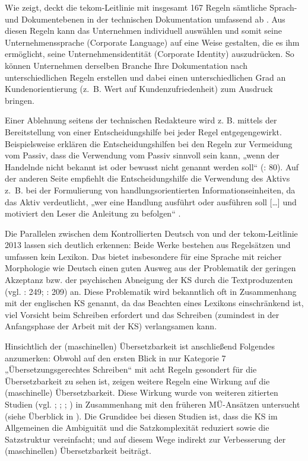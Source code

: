 Wie   zeigt, deckt die tekom-Leitlinie mit insgesamt 167 Regeln sämtliche Sprach- und Dokumentebenen in der technischen Dokumentation umfassend ab \citep{tekom2013}. Aus diesen Regeln kann das Unternehmen individuell auswählen und somit seine Unternehmenssprache (Corporate Language) auf eine Weise gestalten, die es ihm ermöglicht, seine Unternehmensidentität (Corporate Identity) auszudrücken. So können Unternehmen derselben Branche Ihre Dokumentation nach unterschiedlichen Regeln erstellen und dabei einen unterschiedlichen Grad an Kundenorientierung (z.~B. Wert auf Kundenzufriedenheit) zum Ausdruck bringen.

Einer Ablehnung seitens der technischen Redakteure wird z. B. mittels der Bereitstellung von einer Entscheidungshilfe bei jeder Regel entgegengewirkt. Beispielsweise erklären die Entscheidungshilfen bei den Regeln zur Vermeidung vom Passiv, dass die Verwendung vom Passiv sinnvoll sein kann, „wenn der Handelnde nicht bekannt ist oder bewusst nicht genannt werden soll“ (\citealt{tekom2013}: 80). Auf der anderen Seite empfiehlt die Entscheidungshilfe die Verwendung des Aktivs z.~B. bei der Formulierung von handlungsorientierten Informationseinheiten, da das Aktiv verdeutlicht, „wer eine Handlung ausführt oder ausführen soll [\ldots] und motiviert den Leser die Anleitung zu befolgen“ \citep[81]{tekom2013}.

Die Parallelen zwischen dem Kontrollierten Deutsch von \citet{Lehrndorfer1996a} und der tekom-Leitlinie 2013 lassen sich deutlich erkennen: Beide Werke bestehen aus Regelsätzen und umfassen kein Lexikon. Das bietet insbesondere für eine Sprache mit reicher Morphologie wie Deutsch einen guten Ausweg aus der Problematik der geringen Akzeptanz bzw. der psychischen Abneigung der KS durch die Textproduzenten (vgl. \citealt{NybergEtAl2003}: 249; \citealt{DrewerZiegler2014}: 209) an. Diese Problematik wird bekanntlich oft in Zusammenhang mit der englischen KS genannt, da das Beachten eines Lexikons einschränkend ist, viel Vorsicht beim Schreiben erfordert und das Schreiben (zumindest in der Anfangsphase der Arbeit mit der KS) verlangsamen kann.

Hinsichtlich der (maschinellen) Übersetzbarkeit ist anschließend Folgendes anzumerken: Obwohl auf den ersten Blick in   nur Kategorie 7 „Übersetzungsgerechtes Schreiben“ mit acht Regeln gesondert für die Übersetzbarkeit zu sehen ist, zeigen weitere Regeln eine Wirkung auf die (maschinelle) Übersetzbarkeit. Diese Wirkung wurde von weiteren zitierten Studien (vgl. \citealt{BernthGdaniec2001}; \citealt{Reuther2003}; \citealt{Siegel2011}; \citealt{Congree2018}) in Zusammenhang mit den früheren MÜ-Ansätzen untersucht (siehe Überblick in ). Die Grundidee bei diesen Studien ist, dass die KS im Allgemeinen die Ambiguität und die Satzkomplexität reduziert sowie die Satzstruktur vereinfacht; und auf diesem Wege indirekt zur Verbesserung der (maschinellen) Übersetzbarkeit beiträgt.

